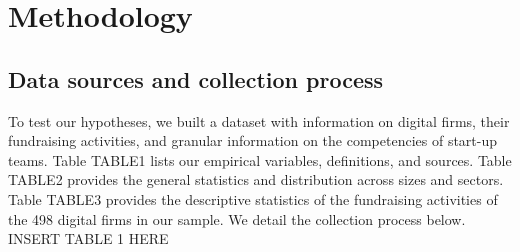 \documentclass[12pt]{article}
\begin{document}
\section{Methodology}

\subsection{Data sources and collection process}

To test our hypotheses, we built a dataset with information on digital firms, their fundraising activities, and granular information on the competencies of start-up teams. Table TABLE1 lists our empirical variables, definitions, and sources. Table TABLE2 provides the general statistics and distribution across sizes and sectors. Table TABLE3 provides the descriptive statistics of the fundraising activities of the 498 digital firms in our sample. We detail the collection process below. \\

INSERT TABLE 1 HERE \\
\end{document}
